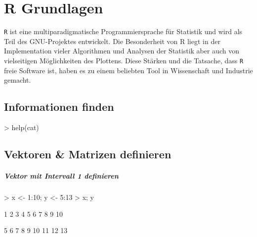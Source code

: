 



\chapter{R Grundlagen}
\lstinline{R} ist eine multiparadigmatische Programmiersprache für 
Statistik und wird als Teil des GNU-Projektes entwickelt. Die 
Besonderheit von R liegt in der Implementation vieler Algorithmen
und Analysen der Statistik aber auch von vielseitigen Möglichkeiten 
des Plottens. Diese Stärken und die Tatsache, dass \lstinline{R} 
freie Software ist, haben es zu einem beliebten Tool in Wissenschaft
und Industrie gemacht.

\newpage


\section{Informationen finden}
\begin{Schunk}
\begin{Sinput}
> help(cat)
\end{Sinput}
\end{Schunk}

\section{Vektoren \& Matrizen definieren}
\paragraph{Vektor mit Intervall 1 definieren}
\begin{Schunk}
\begin{Sinput}
> x <- 1:10; y <- 5:13
> x; y
\end{Sinput}
\begin{Soutput}
 [1]  1  2  3  4  5  6  7  8  9 10
\end{Soutput}
\begin{Soutput}
[1]  5  6  7  8  9 10 11 12 13
\end{Soutput}
\end{Schunk}

